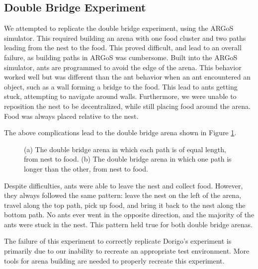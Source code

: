 \documentclass{acm_proc_article-sp}
\begin{document}
\subsection{Double Bridge Experiment}

We attempted to replicate the double bridge experiment\cite{dorigo:aco}, using the ARGoS simulator. This required building an arena with one food cluster and two paths leading from the nest to the food. This proved difficult, and lead to an overall failure, as building paths in ARGoS was cumbersome. Built into the ARGoS simulator, ants are programmed to avoid the edge of the arena. This behavior worked well but was different than the ant behavior when an ant encountered an object, such as a wall forming a bridge to the food. This lead to ants getting stuck, attempting to navigate around walls. Furthermore, we were unable to reposition the nest to be decentralized, while still placing food around the arena. Food was always placed relative to the nest. 

The above complications lead to the double bridge arena shown in Figure \ref{fig:DoubleBridge}.

\begin{figure}[ht]
\centering
{}
\caption{(a) The double bridge arena in which each path is of equal length, from nest to food. (b) The double bridge arena in which one path is longer than the other, from nest to food.} \label{fig:DoubleBridge}
\end{figure}

Despite difficulties, ants were able to leave the nest and collect food. However, they always followed the same pattern: leave the nest on the left of the arena, travel along the top path, pick up food, and bring it back to the nest along the bottom path. No ants ever went in the opposite direction, and the majority of the ants were stuck in the nest. This pattern held true for both double bridge arenas.

The failure of this experiment to correctly replicate Dorigo's\cite{dorigo:aco} experiment is primarily due to our inability to recreate an appropriate test environment. More tools for arena building are needed to properly recreate this experiment.
\end{document}
